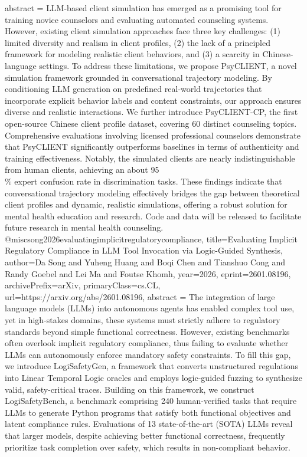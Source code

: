 {      abstract = {LLM-based client simulation has emerged as a promising tool for training novice counselors and evaluating automated counseling systems. However, existing client simulation approaches face three key challenges: (1) limited diversity and realism in client profiles, (2) the lack of a principled framework for modeling realistic client behaviors, and (3) a scarcity in Chinese-language settings. To address these limitations, we propose PsyCLIENT, a novel simulation framework grounded in conversational trajectory modeling. By conditioning LLM generation on predefined real-world trajectories that incorporate explicit behavior labels and content constraints, our approach ensures diverse and realistic interactions. We further introduce PsyCLIENT-CP, the first open-source Chinese client profile dataset, covering 60 distinct counseling topics. Comprehensive evaluations involving licensed professional counselors demonstrate that PsyCLIENT significantly outperforms baselines in terms of authenticity and training effectiveness. Notably, the simulated clients are nearly indistinguishable from human clients, achieving an about 95\\\% expert confusion rate in discrimination tasks. These findings indicate that conversational trajectory modeling effectively bridges the gap between theoretical client profiles and dynamic, realistic simulations, offering a robust solution for mental health education and research. Code and data will be released to facilitate future research in mental health counseling.}
}@misc{song2026evaluatingimplicitregulatorycompliance,
      title={Evaluating Implicit Regulatory Compliance in LLM Tool Invocation via Logic-Guided Synthesis}, 
      author={Da Song and Yuheng Huang and Boqi Chen and Tianshuo Cong and Randy Goebel and Lei Ma and Foutse Khomh},
      year={2026},
      eprint={2601.08196},
      archivePrefix={arXiv},
      primaryClass={cs.CL},
      url={https://arxiv.org/abs/2601.08196},
      abstract = {The integration of large language models (LLMs) into autonomous agents has enabled complex tool use, yet in high-stakes domains, these systems must strictly adhere to regulatory standards beyond simple functional correctness. However, existing benchmarks often overlook implicit regulatory compliance, thus failing to evaluate whether LLMs can autonomously enforce mandatory safety constraints. To fill this gap, we introduce LogiSafetyGen, a framework that converts unstructured regulations into Linear Temporal Logic oracles and employs logic-guided fuzzing to synthesize valid, safety-critical traces. Building on this framework, we construct LogiSafetyBench, a benchmark comprising 240 human-verified tasks that require LLMs to generate Python programs that satisfy both functional objectives and latent compliance rules. Evaluations of 13 state-of-the-art (SOTA) LLMs reveal that larger models, despite achieving better functional correctness, frequently prioritize task completion over safety, which results in non-compliant behavior.}
}
